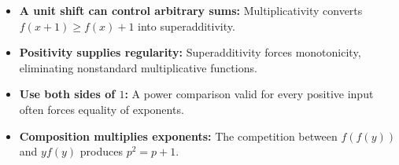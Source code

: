 \begin{takeaways}
\begin{itemize}
\item \textbf{A unit shift can control arbitrary sums:} Multiplicativity converts \(f(x+1)\ge f(x)+1\) into superadditivity.
\item \textbf{Positivity supplies regularity:} Superadditivity forces monotonicity, eliminating nonstandard multiplicative functions.
\item \textbf{Use both sides of \(1\):} A power comparison valid for every positive input often forces equality of exponents.
\item \textbf{Composition multiplies exponents:} The competition between \(f(f(y))\) and \(y f(y)\) produces \(p^2=p+1\).
\end{itemize}
\end{takeaways}
